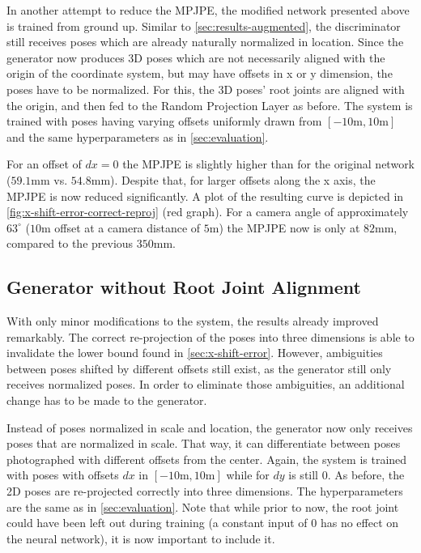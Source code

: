 In another attempt to reduce the MPJPE, the modified network presented above is trained from ground up.
Similar to \autoref{sec:results-augmented}, the discriminator still receives poses which are already naturally normalized in location.
Since the generator now produces 3D poses which are not necessarily aligned with the origin of the coordinate system, but may have offsets in x or y dimension, the poses have to be normalized.
For this, the 3D poses' root joints are aligned with the origin, and then fed to the Random Projection Layer as before.
The system is trained with poses having varying offsets uniformly drawn from $[-10\text{m}, 10\text{m}]$ and the same hyperparameters as in \autoref{sec:evaluation}.

For an offset of $dx = 0$ the MPJPE is slightly higher than for the original network ($59.1$mm vs. $54.8$mm).
Despite that, for larger offsets along the x axis, the MPJPE is now reduced significantly.
A plot of the resulting curve is depicted in \autoref{fig:x-shift-error-correct-reproj} (red graph).
For a camera angle of approximately $63^{\circ}$ ($10$m offset at a camera distance of $5$m) the MPJPE now is only at $82$mm, compared to the previous $350$mm.



\subsection{Generator without Root Joint Alignment}

With only minor modifications to the system, the results already improved remarkably.
The correct re-projection of the poses into three dimensions is able to invalidate the lower bound found in \autoref{sec:x-shift-error}.
However, ambiguities between poses shifted by different offsets still exist, as the generator still only receives normalized poses.
In order to eliminate those ambiguities, an additional change has to be made to the generator.

Instead of poses normalized in scale and location, the generator now only receives poses that are normalized in scale.
That way, it can differentiate between poses photographed with different offsets from the center.
Again, the system is trained with poses with offsets $dx$ in $[-10\text{m}, 10\text{m}]$ while for $dy$ is still $0$.
As before, the 2D poses are re-projected correctly into three dimensions.
The hyperparameters are the same as in \autoref{sec:evaluation}.
Note that while prior to now, the root joint could have been left out during training (a constant input of $0$ has no effect on the neural network), it is now important to include it.

